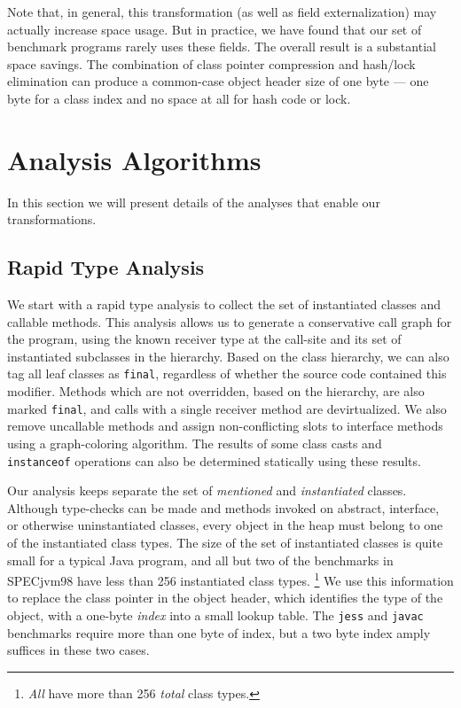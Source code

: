 \documentclass{acmconf}
\begin{document}
Note that, in general, this transformation (as well as field
externalization) may actually increase space usage. But in
practice, we have found that our set of benchmark programs
rarely uses these fields. The overall result is a substantial
space savings. The combination of class pointer compression 
and hash/lock elimination can produce a common-case object header
size of one byte --- one byte for a class index and no
space at all for hash code or lock.
%
\section{Analysis Algorithms}
%
In this section we will present details of the analyses that enable
our transformations.
%
\subsection{Rapid Type Analysis}
We start with a rapid type analysis \cite{bacon96} to collect the set of
instantiated classes and callable methods.  This analysis allows us to generate
a conservative call graph for the program, using the known receiver
type at the call-site and its set of instantiated subclasses in the
hierarchy.  Based on the class hierarchy, we can also tag all leaf
classes as {\tt final}, regardless of whether the source code contained
this modifier.  Methods which are not overridden, based on
the hierarchy, are also marked {\tt final}, and calls with a single
receiver method are devirtualized.  We also remove uncallable methods
and assign non-conflicting slots to interface methods using a
graph-coloring algorithm.  The results of some class casts and {\tt
  instanceof} operations can also be determined statically using
these results.

Our analysis keeps separate the set of {\it mentioned} and
{\it instantiated} classes.  Although type-checks can be made and methods
invoked on abstract, interface, or otherwise uninstantiated classes,
every object
in the heap must belong to one of the instantiated class types.
The size of the set of instantiated classes is quite small for a
typical Java program, and all but two of the benchmarks in SPECjvm98
have less than 256 instantiated class types.%
\footnote{\emph{All} have more than 256 \emph{total} class types.}
We use this information
to replace the class pointer in the object header, which
identifies the type of the object, with a one-byte {\it index} into a
small lookup table.  The {\tt jess} and {\tt javac}
benchmarks require more than one byte of index, but a two byte index
amply suffices in these two cases.
%
\end{document}

